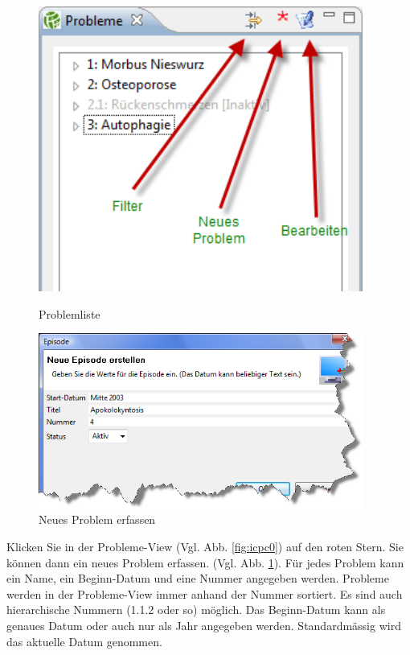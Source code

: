 \documentclass[a4paper]{scrartcl}
\begin{document}
\begin{figure}[htbp]

     \begin{minipage}{0.4\textwidth}
      \centering
       \includegraphics[width=0.95\textwidth]{icpc0}
       \caption{Problemliste}
       	\label{fig:icpc0}
     \end{minipage}\hfill
     \begin{minipage}{0.6\textwidth}
      \centering
       \includegraphics[width=0.95\textwidth]{icpc1}
       \caption{Neues Problem erfassen}
       \label{fig:icpc2}
    \end{minipage}

\end{figure}
Klicken Sie in der Probleme-View (Vgl. Abb. \ref{fig:icpc0}) auf den roten Stern. Sie können dann ein neues Problem erfassen. (Vgl. Abb. \ref{fig:icpc2}). Für jedes Problem kann ein Name, ein Beginn-Datum und eine Nummer angegeben werden. Probleme werden in der Probleme-View immer anhand der Nummer sortiert. Es sind auch hierarchische Nummern (1.1.2 oder so) möglich. Das Beginn-Datum kann als genaues Datum oder auch nur als Jahr angegeben werden. Standardmässig wird das aktuelle Datum genommen.
\end{document}
